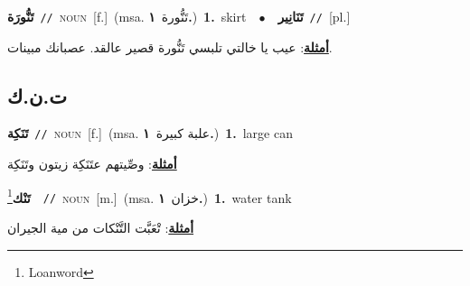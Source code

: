 \documentclass[10pt,a4paper,twoside]{article} %
\begin{document}
\begin{multicols}{2}
{\setlength\topsep{0pt}\textbf{\foreignlanguage{arabic}{تَنُّورَة}}\ {\color{gray}\texttt{//}\color{black}}\ \textsc{noun}\ [f.]\ \color{gray}(msa. \foreignlanguage{arabic}{تَنُّورة}~\foreignlanguage{arabic}{\textbf{١.}})\color{black}\ \textbf{1.}~skirt\ \ $\bullet$\ \ \setlength\topsep{0pt}\textbf{\foreignlanguage{arabic}{تَنَانِير}}\ {\color{gray}\texttt{//}\color{black}}\ [pl.]\  \begin{flushright}\color{gray}\foreignlanguage{arabic}{\textbf{\underline{\foreignlanguage{arabic}{أمثلة}}}: عيب يا خالتي تلبسي تَنُّورة قصير عالقد. عصبانك مبينات.}\end{flushright}\color{black}} \vspace{2mm}

\vspace{-3mm}
\subsection*{\color{blue}\foreignlanguage{arabic}{ت.ن.ك}\color{blue}{}} 

{\setlength\topsep{0pt}\textbf{\foreignlanguage{arabic}{تَنَكِة}}\ {\color{gray}\texttt{//}\color{black}}\ \textsc{noun}\ [f.]\ \color{gray}(msa. \foreignlanguage{arabic}{علبة كبيرة}~\foreignlanguage{arabic}{\textbf{١.}})\color{black}\ \textbf{1.}~large can\  \begin{flushright}\color{gray}\foreignlanguage{arabic}{\textbf{\underline{\foreignlanguage{arabic}{أمثلة}}}: وصِّيتهم عتَنَكِة زيتون وتَنَكِة}\end{flushright}\color{black}} \vspace{2mm}

{\setlength\topsep{0pt}\textbf{\foreignlanguage{arabic}{تَنْك}}\footnote{Loanword}\ \ {\color{gray}\texttt{//}\color{black}}\ \textsc{noun}\ [m.]\ \color{gray}(msa. \foreignlanguage{arabic}{خزان}~\foreignlanguage{arabic}{\textbf{١.}})\color{black}\ \textbf{1.}~water tank\  \begin{flushright}\color{gray}\foreignlanguage{arabic}{\textbf{\underline{\foreignlanguage{arabic}{أمثلة}}}: تْعَبَّت التَّنْكات من مية الجيران}\end{flushright}\color{black}} \vspace{2mm}


\end{multicols}
\end{document}
